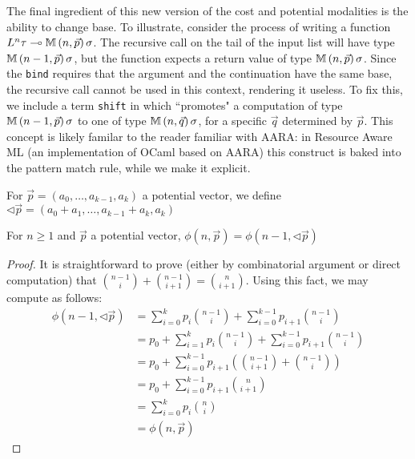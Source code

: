 The final ingredient of this new version of the cost and potential modalities is the ability to change base. To illustrate, consider the process of writing a function $L^n \tau \multimap \mathbb{M} \, (n,\vec{p}) \, \sigma$. The recursive call on the tail of the input list will have type $\mathbb{M} \, (n-1,\vec{p}) \, \sigma$, but the function expects a return value of type $\mathbb{M} \, (n,\vec{p}) \, \sigma$. Since the \texttt{bind} requires that the argument and the continuation have the same base, the recursive call cannot be used in this context, rendering it useless. To fix this, we include a term \texttt{shift} in \dlambdaamor which ``promotes" a computation of type $\mathbb{M} \, (n-1,\vec{p}) \, \sigma$ to one of type $\mathbb{M} \, (n,\vec{q}) \, \sigma$, for a specific $\vec{q}$ determined by $\vec{p}$. This concept is likely familar to the reader familiar with AARA: in Resource Aware ML (an implementation of OCaml based on AARA) this construct is baked into the pattern match rule, while we make it explicit.

\begin{definition}
For $\vec{p} = (a_0,\dots,a_{k-1},a_k)$ a potential vector, we define $\lhd \vec{p} = (a_0 + a_1,\dots,a_{k-1} + a_k,a_k)$
\end{definition}

\begin{theorem}
For $n \geq 1$ and $\vec{p}$ a potential vector, $\phi(n,\vec{p}) = \phi(n-1,\lhd \vec{p})$
\label{thm:raml-shift}
\end{theorem}
\begin{proof}
It is straightforward to prove (either by combinatorial argument or direct computation) that $\binom{n-1}{i} + \binom{n-1}{i+1} = \binom{n}{i+1}$. Using this fact,
we may compute as follows:
\begin{align*}
  \phi(n-1,\lhd \vec{p}) &= \sum_{i=0}^k p_i\binom{n-1}{i} + \sum_{i=0}^{k-1} p_{i+1}\binom{n-1}{i}\\
                         &= p_0 + \sum_{i=1}^k p_i\binom{n-1}{i} + \sum_{i=0}^{k-1} p_{i+1}\binom{n-1}{i}\\
                         &= p_0 + \sum_{i=0}^{k-1} p_{i+1}\left(\binom{n-1}{i+1} + \binom{n-1}{i}\right)\\
                         &= p_0 + \sum_{i=0}^{k-1} p_{i+1}\binom{n}{i+1}\\
                         &= \sum_{i=0}^k p_i \binom{n}{i}\\
                         &= \phi(n,\vec{p})
\end{align*}
\end{proof}

